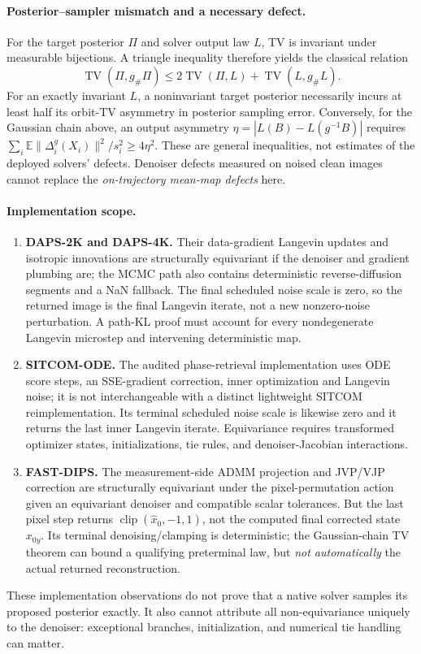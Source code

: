 \paragraph{Posterior--sampler mismatch and a necessary defect.}
For the target posterior $\Pi$ and solver output law $L$,
TV is invariant under measurable bijections. A triangle inequality
therefore yields the classical relation
\[
 \operatorname{TV}(\Pi,g_\#\Pi)
 \le 2\operatorname{TV}(\Pi,L)
       +\operatorname{TV}(L,g_\#L).
\]
For an exactly invariant $L$, a noninvariant target posterior
necessarily incurs at least half its orbit-TV asymmetry in posterior
sampling error. Conversely, for the Gaussian chain above, an output
asymmetry $\eta=|L(B)-L(g^{-1}B)|$ requires
$\sum_i\mathbb E\|\Delta_i^g(X_i)\|^2/s_i^2\ge4\eta^2$.
These are general inequalities, not estimates of the deployed
solvers' defects. Denoiser defects measured on noised clean images
cannot replace the \emph{on-trajectory mean-map defects} here.

\paragraph{Implementation scope.}
\begin{enumerate}
\item \textbf{DAPS-2K and DAPS-4K.}
Their data-gradient Langevin updates and isotropic innovations are
structurally equivariant if the denoiser and gradient plumbing are;
the MCMC path also contains deterministic reverse-diffusion segments
and a NaN fallback. The final scheduled noise scale is zero,
so the returned image is the final Langevin iterate, not a
new nonzero-noise perturbation. A path-KL proof must account for every
nondegenerate Langevin microstep and intervening deterministic map.
\item \textbf{SITCOM-ODE.}
The audited phase-retrieval implementation uses ODE score steps,
an SSE-gradient correction, inner optimization and Langevin noise;
it is not interchangeable with a distinct lightweight SITCOM
reimplementation. Its terminal scheduled
noise scale is likewise zero and it returns the last inner
Langevin iterate. Equivariance requires transformed optimizer states,
initializations, tie rules, and denoiser-Jacobian interactions.
\item \textbf{FAST-DIPS.}
The measurement-side ADMM projection and JVP/VJP correction are
structurally equivariant under the pixel-permutation action given
an equivariant denoiser and compatible scalar tolerances. But the
last pixel step returns $\operatorname{clip}(\widehat x_0,-1,1)$,
not the computed final corrected state $x_{0y}$. Its terminal
denoising/clamping is deterministic; the Gaussian-chain TV theorem
can bound a qualifying preterminal law, but \emph{not automatically}
the actual returned reconstruction.
\end{enumerate}
These implementation observations do not prove that a native
solver samples its proposed posterior exactly. It also cannot attribute
all non-equivariance uniquely to the denoiser: exceptional branches,
initialization, and numerical tie handling can matter.

